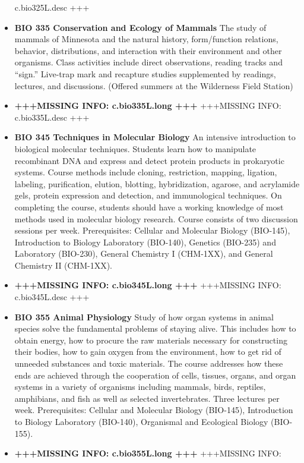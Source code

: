 \documentclass[
  letterpaper,
]{scrbook}
\begin{document}
\begin{itemize}
  c.bio325L.desc +++
\item
  \textbf{BIO 335 Conservation and Ecology of Mammals} The study of
  mammals of Minnesota and the natural history, form/function relations,
  behavior, distributions, and interaction with their environment and
  other organisms. Class activities include direct observations, reading
  tracks and ``sign.'' Live-trap mark and recapture studies supplemented
  by readings, lectures, and discussions. (Offered summers at the
  Wilderness Field Station)
\item
  \textbf{+++MISSING INFO: c.bio335L.long +++} +++MISSING INFO:
  c.bio335L.desc +++
\item
  \textbf{BIO 345 Techniques in Molecular Biology} An intensive
  introduction to biological molecular techniques. Students learn how to
  manipulate recombinant DNA and express and detect protein products in
  prokaryotic systems. Course methods include cloning, restriction,
  mapping, ligation, labeling, purification, elution, blotting,
  hybridization, agarose, and acrylamide gels, protein expression and
  detection, and immunological techniques. On completing the course,
  students should have a working knowledge of most methods used in
  molecular biology research. Course consists of two discussion sessions
  per week. Prerequisites: Cellular and Molecular Biology (BIO-145),
  Introduction to Biology Laboratory (BIO-140), Genetics (BIO-235) and
  Laboratory (BIO-230), General Chemistry I (CHM-1XX), and General
  Chemistry II (CHM-1XX).
\item
  \textbf{+++MISSING INFO: c.bio345L.long +++} +++MISSING INFO:
  c.bio345L.desc +++
\item
  \textbf{BIO 355 Animal Physiology} Study of how organ systems in
  animal species solve the fundamental problems of staying alive. This
  includes how to obtain energy, how to procure the raw materials
  necessary for constructing their bodies, how to gain oxygen from the
  environment, how to get rid of unneeded substances and toxic
  materials. The course addresses how these ends are achieved through
  the cooperation of cells, tissues, organs, and organ systems in a
  variety of organisms including mammals, birds, reptiles, amphibians,
  and fish as well as selected invertebrates. Three lectures per week.
  Prerequisites: Cellular and Molecular Biology (BIO-145), Introduction
  to Biology Laboratory (BIO-140), Organismal and Ecological Biology
  (BIO-155).
\item
  \textbf{+++MISSING INFO: c.bio355L.long +++} +++MISSING INFO:

\end{itemize}
\end{document}
